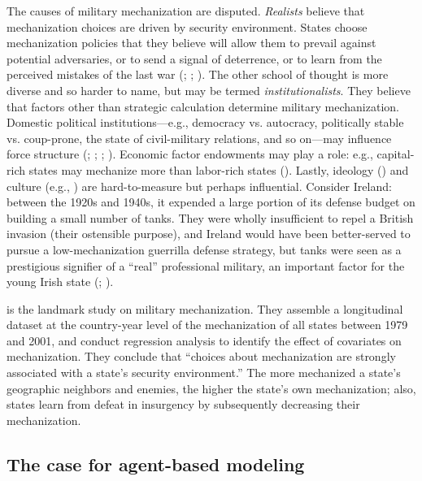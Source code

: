 \documentclass{article}
\begin{document}
The causes of military mechanization are disputed. \textit{Realists} believe 
that mechanization choices are driven by security environment. States
choose mechanization policies that they believe will allow them to prevail against potential adversaries, or to send a
signal of deterrence, or to learn from the perceived mistakes of the last war
(\cite{mearsheimer1983conventional};
\cite{huth1988extended}; \cite{murray2011military}). The other school of thought is more
diverse and so harder to name, but may be termed 
\textit{institutionalists}. They believe that factors other than 
strategic calculation determine military mechanization. Domestic political
institutions---e.g., democracy vs. autocracy, politically stable vs.
coup-prone, the state of civil-military relations, and so on---may influence 
force structure (\cite{reiter2002democracies}; \cite{quinlivan1999coup};
\cite{talmadge2015dictator}; \cite{brooks2008shaping}). Economic factor
endowments may play a role: e.g., capital-rich states may mechanize more
than labor-rich states (\cite{gartzke2001democracy}). Lastly,
ideology (\cite{van1984cult}) and culture (e.g., \cite{pollack2004arabs}) are
hard-to-measure but perhaps influential. Consider Ireland: between the 1920s and
1940s, it expended a large portion of its defense budget on building
a small number of tanks. They were wholly insufficient to repel a British 
invasion (their ostensible purpose), and
Ireland would have been better-served to pursue a low-mechanization guerrilla
defense strategy, but tanks were seen as a prestigious signifier of a ``real''
professional military, an important factor for the young Irish state
(\cite{farrell1998professionalization};
\cite{farrell2001transnational}).

\cite{sechser2010army} is the landmark study on military mechanization. They
assemble a longitudinal dataset at the country-year level of the mechanization
of all states between 1979 and 2001, and conduct regression analysis to identify
the effect of covariates on mechanization. They conclude that ``choices about
mechanization are strongly associated with a state's security environment.''
The more mechanized a state's geographic neighbors and enemies, the higher the state's 
own mechanization; also, states
learn from defeat in insurgency by subsequently decreasing their mechanization.

\subsection{The case for agent-based modeling}
\end{document}
